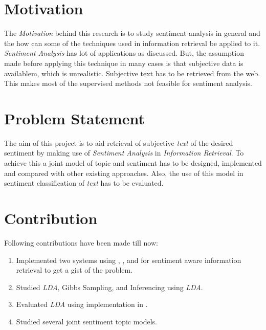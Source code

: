 \section{Motivation}
\par
The \textit{Motivation} behind this research is to study sentiment analysis in general and the how can some of the techniques used in information 
retrieval be applied to it. \textit{Sentiment Analysis} has lot of applications as discussed. But, the assumption made before applying this technique in
many cases is that subjective data is availablem, which is unrealistic. Subjective text has to be retrieved from the web. This makes most
of the supervised methods not feasible for sentiment analysis. 


\section{Problem Statement}
\par
The aim of this project is to aid retrieval of subjective \textit{text} of the desired sentiment by making use of \textit{Sentiment Analysis}
in \textit{Information Retrieval}. To achieve this a joint model of topic and sentiment has to be designed, implemented and compared with
other existing approaches. Also, the use of this model in sentiment classification of \textit{text} has to be evaluated.

\section{Contribution}
\par
Following contributions have been made till now:
\begin{enumerate}
 \item Implemented two systems using \citep*{apachelucene}, \citep*{sentiwordnet}, and \citep*{stanfordpostagger} for sentiment aware information
 retrieval to get a gist of the problem.
 \item Studied \textit{LDA}, Gibbs Sampling, and Inferencing using \textit{LDA}.
 \item Evaluated \textit{LDA} using implementation in \citep*{mallet}.
 \item Studied several joint sentiment topic models.
\end{enumerate}


